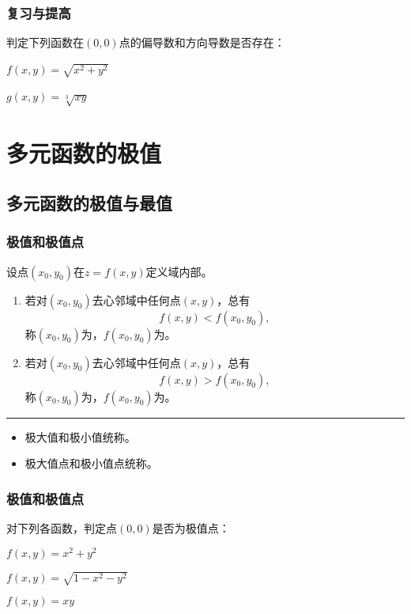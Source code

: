 \documentclass[14pt,notheorems,leqno,xcolor={rgb}]{beamer} %
\begin{document}
\begin{frame}
\frametitle{复习与提高}
\begin{puzzle}
判定下列函数在$(0,0)$点的偏导数和方向导数是否存在：
\begin{enumhalf}
  \item $f(x,y)=\sqrt{x^2+y^2}$ ~
  \item $g(x,y)=\sqrt[3]{xy}$ ~
\end{enumhalf}
\end{puzzle}
\end{frame}

\fi %

\makeatletter
{}\relax %
\setcounter{section}{7}
\makeatother

\section{多元函数的极值}

\subsection{多元函数的极值与最值}

\begin{frame}%
\frametitle{极值和极值点}
\begin{definition*}
设点$(x_0,y_0)$在$z=f(x,y)$定义域内部。\pause
\begin{enumerate}
  \item 若对$(x_0,y_0)$去心邻域中任何点$(x,y)$，总有$$f(x,y)<f(x_0,y_0),$$\pause
        称$(x_0,y_0)$为，$f(x_0,y_0)$为。\pause
  \item 若对$(x_0,y_0)$去心邻域中任何点$(x,y)$，总有$$f(x,y)>f(x_0,y_0),$$\pause
        称$(x_0,y_0)$为，$f(x_0,y_0)$为。
\end{enumerate}
\end{definition*}
\vpause\hrule
\begin{itemize}
  \item 极大值和极小值统称。
  \item 极大值点和极小值点统称。
\end{itemize}
\end{frame}

\begin{frame}
\frametitle{极值和极值点}
\begin{example}
对下列各函数，判定点$(0,0)$是否为极值点：\pause
\begin{enumlite}[<+->]
  \item $f(x,y)=x^2+y^2$
  \item $f(x,y)=\sqrt{1-x^2-y^2}$
  \item $f(x,y)=xy$
\end{enumlite}
\end{example}
\end{frame}
\end{document}
